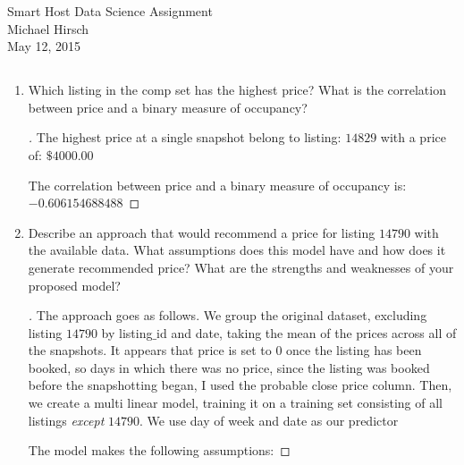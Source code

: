 \documentclass[]{article}
\theoremstyle{definition}
\begin{document}
\thispagestyle{empty}

\begin{center}
{\Large Smart Host Data Science Assignment}\\
Michael Hirsch\\ %
May 12, 2015 %
\end{center}

\vspace{0.2 cm}


\subsection*{}


\begin{enumerate}
\item\label{norms}

Which listing in the comp set has the highest price?  What is the correlation between price and a binary measure of occupancy?


\begin{proof}[\unskip\nopunct]\renewcommand{\qedsymbol}{}
	The highest price at a single snapshot belong to listing:  $14829$  with a price of:  $\$4000.00$

	The correlation between price and a binary measure of occupancy is: $-0.606154688488$
\end{proof}

\item

Describe an approach that would recommend a price for listing $14790$ with the available data.  What assumptions does this model have and how does it generate recommended price?  What are the strengths and weaknesses of your proposed model?

\begin{proof}[\unskip\nopunct]\renewcommand{\qedsymbol}{}

The approach goes as follows. We group the original dataset, excluding listing $14790$ by listing$\_$id and date, taking the mean of the prices across all of the snapshots. It appears that price is set to $0$ once the listing has been booked, so days in which there was no price, since the listing was booked before the snapshotting began, I used the probable close price column. Then, we create a multi linear model, training it on a training set consisting of all listings \textit{except} $14790$. We use day of week and date as our predictor

The model makes the following assumptions:


\end{proof}
\end{enumerate}
\end{document}
